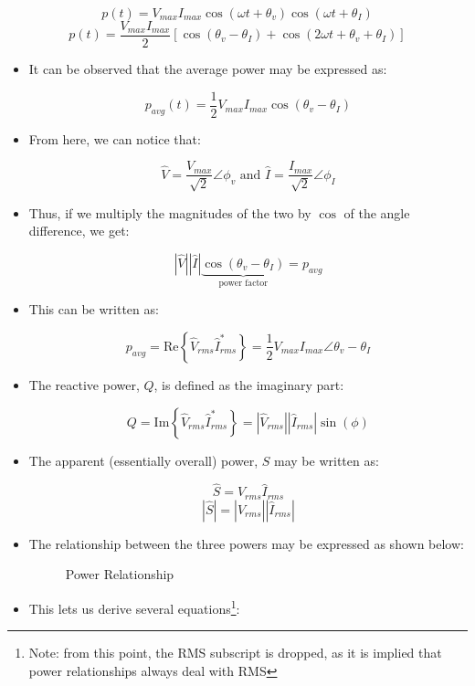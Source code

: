 \begin{itemize}
    $$p(t)=V_{max}I_{max}\cos(\omega t +\theta_v)\cos(\omega t+\theta_I)$$
    $$p(t)=\frac{V_{max}I_{max}}{2}\left[\cos(\theta_v-\theta_I)+\cos(2\omega t+\theta_v+\theta_I)\right]$$

    \begin{itemize}

      \item It can be observed that the average power may be expressed as:

        $$p_{avg}(t)=\frac{1}{2}V_{max}I_{max}\cos(\theta_v-\theta_I)$$

      \item From here, we can notice that:

        $$\hat{V}=\frac{V_{max}}{\sqrt{2}}\angle\phi_v\text{ and }\hat{I}=\frac{I_{max}}{\sqrt{2}}\angle\phi_I$$

      \item Thus, if we multiply the magnitudes of the two by $\cos$ of the angle difference, we get:

        $$|\hat{V}||\hat{I}|\underbrace{\cos(\theta_v-\theta_I)}_{\text{power factor}}=p_{avg}$$

      \item This can be written as:

        $$p_{avg}=\text{Re}\left\{ \hat{V}_{rms}\hat{I}_{rms}^* \right\}=\frac{1}{2}V_{max}I_{max}\angle\theta_v-\theta_I$$

      \item The reactive power, $Q$, is defined as the imaginary part:

        $$Q=\text{Im}\left\{ \hat{V}_{rms}\hat{I}_{rms}^* \right\}=|\hat{V}_{rms}||\hat{I}_{rms}|\sin(\phi)$$

      \item The apparent (essentially overall) power, $S$ may be written as:

        $$\hat{S}=\hat{V}_{rms}\hat{I}_{rms}$$
        $$|\hat{S}|=|\hat{V}_{rms}||\hat{I}_{rms}|$$

      \item The relationship between the three powers may be expressed as shown below:

        \begin{figure}[H]
          \centering
          
          \caption{Power Relationship}
          \label{fig:2}
        \end{figure}

      \item This lets us derive several equations\footnote{Note: from this point, the RMS subscript is dropped, as it is implied that power relationships always deal with RMS}:


\end{itemize}
\end{itemize}
